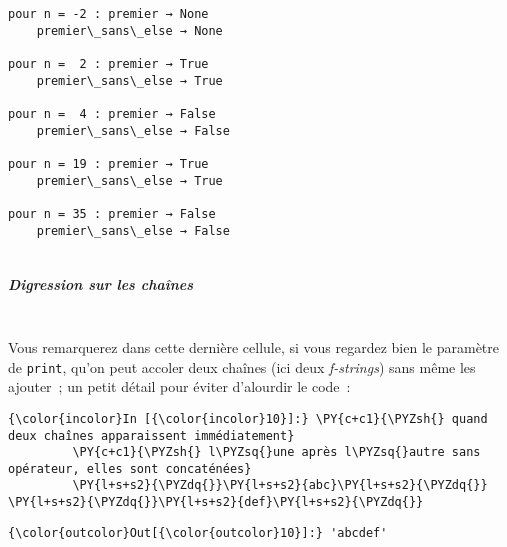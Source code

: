     \begin{Verbatim}[commandchars=\\\{\}]
pour n = -2 : premier → None
    premier\_sans\_else → None

pour n =  2 : premier → True
    premier\_sans\_else → True

pour n =  4 : premier → False
    premier\_sans\_else → False

pour n = 19 : premier → True
    premier\_sans\_else → True

pour n = 35 : premier → False
    premier\_sans\_else → False


    \end{Verbatim}

    \hypertarget{digression-sur-les-chauxeenes}{%
\subparagraph{Digression sur les
chaînes\\\\}\label{digression-sur-les-chauxeenes}}

    Vous remarquerez dans cette dernière cellule, si vous regardez bien le
paramètre de \texttt{print}, qu'on peut accoler deux chaînes (ici deux
\emph{f-strings}) sans même les ajouter~; un petit détail pour éviter
d'alourdir le code~:

    \begin{Verbatim}[commandchars=\\\{\}]
{\color{incolor}In [{\color{incolor}10}]:} \PY{c+c1}{\PYZsh{} quand deux chaînes apparaissent immédiatement}
         \PY{c+c1}{\PYZsh{} l\PYZsq{}une après l\PYZsq{}autre sans opérateur, elles sont concaténées}
         \PY{l+s+s2}{\PYZdq{}}\PY{l+s+s2}{abc}\PY{l+s+s2}{\PYZdq{}} \PY{l+s+s2}{\PYZdq{}}\PY{l+s+s2}{def}\PY{l+s+s2}{\PYZdq{}}
\end{Verbatim}


\begin{Verbatim}[commandchars=\\\{\}]
{\color{outcolor}Out[{\color{outcolor}10}]:} 'abcdef'
\end{Verbatim}